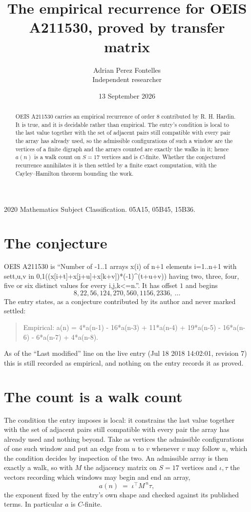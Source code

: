 \documentclass[11pt,a4paper]{article}
\title{The empirical recurrence for OEIS A211530, proved by transfer matrix}
\author{Adrian Perez Fontelles\\ \small Independent researcher}
\date{13 September 2026}
\theoremstyle{plain}
\theoremstyle{definition}
\begin{document}
\maketitle

\begin{abstract}
OEIS A211530 carries an empirical recurrence of order $8$ contributed by R. H. Hardin. It is
true, and it is decidable rather than empirical. The entry's condition is local to the last value together with the set of adjacent pairs still compatible with every pair the array has already used, so
the admissible configurations of such a window are the vertices of a finite digraph and the
arrays counted are exactly the walks in it; hence $a(n)$ is a walk count on $S=17$ vertices
and is $C$-finite. Whether the conjectured recurrence annihilates it is then settled by a
finite exact computation, with the Cayley--Hamilton theorem bounding the work.
\end{abstract}

\noindent\small 2020 Mathematics Subject Classification. 05A15, 05B45, 15B36.\normalsize

\section{The conjecture}

OEIS A211530 is ``Number of -1..1 arrays x(i) of n+1 elements i=1..n+1 with set{t,u,v in 0,1}((x[i+t]+x[j+u]+x[k+v])*(-1)\^{}(t+u+v)) having two, three, four, five or six distinct values for every i,j,k<=n.''. It has offset $1$ and begins
\[
8, 22, 56, 124, 270, 560, 1156, 2336,\ \dots
\]
The entry states, as a conjecture contributed by its author and never marked settled:
\begin{quote}
Empirical: a(n) = 4*a(n-1) - 16*a(n-3) + 11*a(n-4) + 19*a(n-5) - 16*a(n-6) - 6*a(n-7) + 4*a(n-8).
\end{quote}
As of the ``Last modified'' line on the live entry (Jul 18 2018 14:02:01, revision 7) this is still
recorded as empirical, and nothing on the entry records it as proved.

\section{The count is a walk count}

The condition the entry imposes is local: it constrains the last value together with the set of adjacent pairs still compatible with every pair the array has already used and nothing beyond. Take as
vertices the admissible configurations of one such window and put an edge from $u$ to $v$
whenever $v$ may follow $u$, which the condition decides by inspection of the two. An
admissible array is then exactly a walk, so with $M$ the adjacency matrix on $S=17$ vertices
and $\iota,\tau$ the vectors recording which windows may begin and end an array,
\[
a(n)\;=\;\iota^{\!\top}M^{\,n}\tau ,
\]
the exponent fixed by the entry's own shape and checked against its published terms. In
particular $a$ is $C$-finite.
\end{document}
